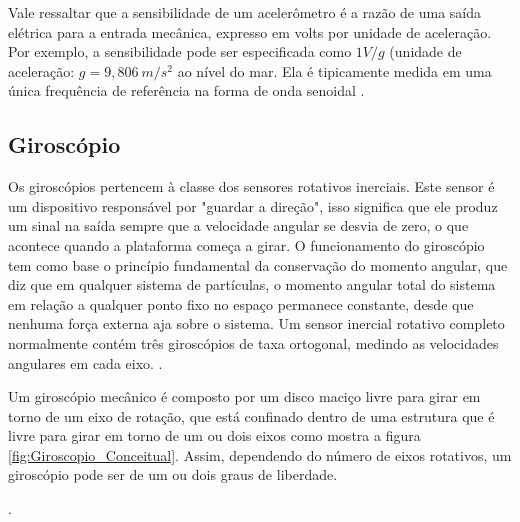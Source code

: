 Vale ressaltar que a sensibilidade de um acelerômetro é a razão de uma saída elétrica para a entrada mecânica, expresso em volts por unidade de aceleração. Por exemplo, a sensibilidade pode ser especificada como $1 V/g$ (unidade de aceleração: $ g = 9,806 \ m/s^2$ ao nível do mar. Ela é tipicamente medida em uma única frequência de referência na forma de onda senoidal \cite{Korvink2006}.


\newpage













\subsection{Giroscópio}


 

Os giroscópios pertencem à classe dos sensores rotativos inerciais. Este sensor é um dispositivo responsável por "guardar a direção", isso significa que ele produz um sinal na saída sempre que a velocidade angular se desvia de zero, o que acontece quando a plataforma começa a girar. O funcionamento do giroscópio tem como base o princípio fundamental da conservação do momento angular, que diz que em qualquer sistema de partículas, o momento angular total do sistema em relação a qualquer ponto fixo no espaço permanece constante, desde que nenhuma força externa aja sobre o sistema. Um sensor inercial rotativo completo normalmente contém três giroscópios de taxa ortogonal, medindo as velocidades angulares em cada eixo. \cite{ModernSensors}. 

Um giroscópio mecânico é composto por um disco maciço livre para girar em torno de um eixo de rotação, que está confinado dentro de uma estrutura que é livre para girar em torno de um ou dois eixos como mostra a figura \ref{fig:Giroscopio_Conceitual}. Assim, dependendo do número de eixos rotativos, um giroscópio pode ser de um ou dois graus de liberdade. 


 .



